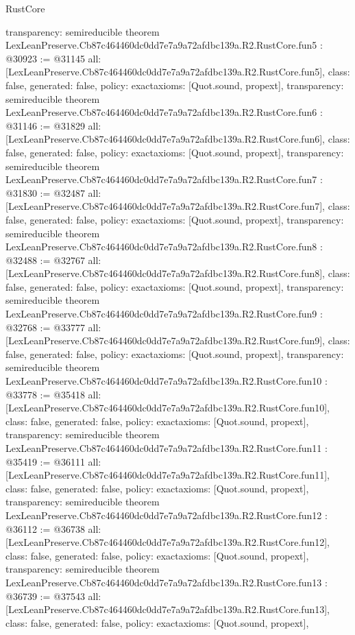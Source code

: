 \begin{lexlean}{RustCore}
\begin{coremodule}
{  transparency: semireducible
}
theorem LexLeanPreserve.Cb87c464460dc0dd7e7a9a72afdbc139a.R2.RustCore.fun5 : @30923 := @31145 {
  all: [LexLeanPreserve.Cb87c464460dc0dd7e7a9a72afdbc139a.R2.RustCore.fun5],
  class: false,
  generated: false,
  policy: exact{axioms: [Quot.sound, propext]},
  transparency: semireducible
}
theorem LexLeanPreserve.Cb87c464460dc0dd7e7a9a72afdbc139a.R2.RustCore.fun6 : @31146 := @31829 {
  all: [LexLeanPreserve.Cb87c464460dc0dd7e7a9a72afdbc139a.R2.RustCore.fun6],
  class: false,
  generated: false,
  policy: exact{axioms: [Quot.sound, propext]},
  transparency: semireducible
}
theorem LexLeanPreserve.Cb87c464460dc0dd7e7a9a72afdbc139a.R2.RustCore.fun7 : @31830 := @32487 {
  all: [LexLeanPreserve.Cb87c464460dc0dd7e7a9a72afdbc139a.R2.RustCore.fun7],
  class: false,
  generated: false,
  policy: exact{axioms: [Quot.sound, propext]},
  transparency: semireducible
}
theorem LexLeanPreserve.Cb87c464460dc0dd7e7a9a72afdbc139a.R2.RustCore.fun8 : @32488 := @32767 {
  all: [LexLeanPreserve.Cb87c464460dc0dd7e7a9a72afdbc139a.R2.RustCore.fun8],
  class: false,
  generated: false,
  policy: exact{axioms: [Quot.sound, propext]},
  transparency: semireducible
}
theorem LexLeanPreserve.Cb87c464460dc0dd7e7a9a72afdbc139a.R2.RustCore.fun9 : @32768 := @33777 {
  all: [LexLeanPreserve.Cb87c464460dc0dd7e7a9a72afdbc139a.R2.RustCore.fun9],
  class: false,
  generated: false,
  policy: exact{axioms: [Quot.sound, propext]},
  transparency: semireducible
}
theorem LexLeanPreserve.Cb87c464460dc0dd7e7a9a72afdbc139a.R2.RustCore.fun10 : @33778 := @35418 {
  all: [LexLeanPreserve.Cb87c464460dc0dd7e7a9a72afdbc139a.R2.RustCore.fun10],
  class: false,
  generated: false,
  policy: exact{axioms: [Quot.sound, propext]},
  transparency: semireducible
}
theorem LexLeanPreserve.Cb87c464460dc0dd7e7a9a72afdbc139a.R2.RustCore.fun11 : @35419 := @36111 {
  all: [LexLeanPreserve.Cb87c464460dc0dd7e7a9a72afdbc139a.R2.RustCore.fun11],
  class: false,
  generated: false,
  policy: exact{axioms: [Quot.sound, propext]},
  transparency: semireducible
}
theorem LexLeanPreserve.Cb87c464460dc0dd7e7a9a72afdbc139a.R2.RustCore.fun12 : @36112 := @36738 {
  all: [LexLeanPreserve.Cb87c464460dc0dd7e7a9a72afdbc139a.R2.RustCore.fun12],
  class: false,
  generated: false,
  policy: exact{axioms: [Quot.sound, propext]},
  transparency: semireducible
}
theorem LexLeanPreserve.Cb87c464460dc0dd7e7a9a72afdbc139a.R2.RustCore.fun13 : @36739 := @37543 {
  all: [LexLeanPreserve.Cb87c464460dc0dd7e7a9a72afdbc139a.R2.RustCore.fun13],
  class: false,
  generated: false,
  policy: exact{axioms: [Quot.sound, propext]},
}
\end{coremodule}
\end{lexlean}

